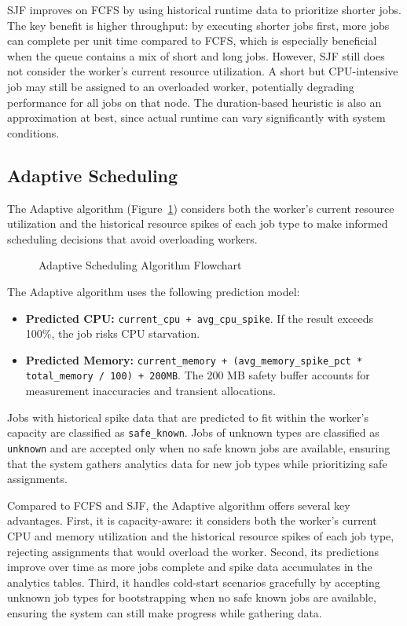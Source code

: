 SJF improves on FCFS by using historical runtime data to prioritize shorter jobs. The key benefit is higher throughput: by executing shorter jobs first, more jobs can complete per unit time compared to FCFS, which is especially beneficial when the queue contains a mix of short and long jobs. However, SJF still does not consider the worker's current resource utilization. A short but CPU-intensive job may still be assigned to an overloaded worker, potentially degrading performance for all jobs on that node. The duration-based heuristic is also an approximation at best, since actual runtime can vary significantly with system conditions.

\subsection{Adaptive Scheduling}

The Adaptive algorithm (Figure~\ref{fig:adaptive-flowchart}) considers both the worker's current resource utilization and the historical resource spikes of each job type to make informed scheduling decisions that avoid overloading workers.

\begin{figure}[htbp]
	\centering
	\caption{Adaptive Scheduling Algorithm Flowchart}
	\label{fig:adaptive-flowchart}
\end{figure}

The Adaptive algorithm uses the following prediction model:

\begin{itemize}
	\item \textbf{Predicted CPU:} \texttt{current\_cpu + avg\_cpu\_spike}. If the result exceeds 100\%, the job risks CPU starvation.
	\item \textbf{Predicted Memory:} \texttt{current\_memory + (avg\_memory\_spike\_pct * total\_memory / 100) + 200MB}. The 200 MB safety buffer accounts for measurement inaccuracies and transient allocations.
\end{itemize}

Jobs with historical spike data that are predicted to fit within the worker's capacity are classified as \texttt{safe\_known}. Jobs of unknown types are classified as \texttt{unknown} and are accepted only when no safe known jobs are available, ensuring that the system gathers analytics data for new job types while prioritizing safe assignments.

Compared to FCFS and SJF, the Adaptive algorithm offers several key advantages. First, it is capacity-aware: it considers both the worker's current CPU and memory utilization and the historical resource spikes of each job type, rejecting assignments that would overload the worker. Second, its predictions improve over time as more jobs complete and spike data accumulates in the analytics tables. Third, it handles cold-start scenarios gracefully by accepting unknown job types for bootstrapping when no safe known jobs are available, ensuring the system can still make progress while gathering data.

